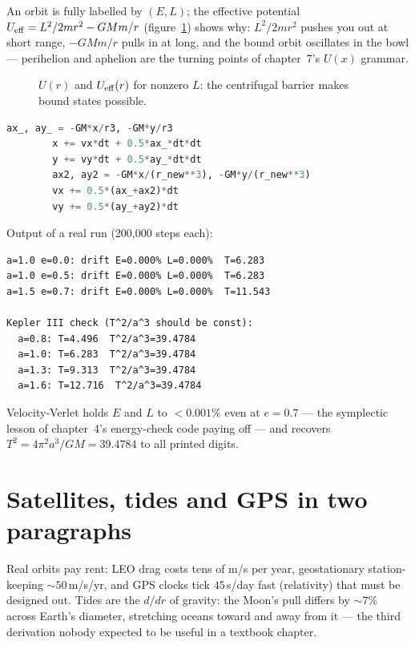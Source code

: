 An orbit is fully labelled by $(E,L)$; the effective potential
$U_{\rm eff}=L^{2}/2mr^{2}-GMm/r$ (figure~\ref{fig:ur}) shows why:
$L^{2}/2mr^{2}$ pushes you out at short range, $-GMm/r$ pulls in at
long, and the bound orbit oscillates in the bowl --- perihelion and
aphelion are the turning points of chapter~7's $U(x)$ grammar.

\begin{figure}[htbp]\centering

\caption{$U(r)$ and $U_{\rm eff}(r)$ for nonzero $L$: the centrifugal
barrier makes bound states possible.}
\label{fig:ur}
\end{figure}

\begin{lstlisting}[language=Python,caption={\texttt{code/ch08\_orbit\_verlet.py} --- velocity-Verlet orbit; $E,L$ drift and Kepler check.},label={lst:orbit}]
        ax_, ay_ = -GM*x/r3, -GM*y/r3
        x += vx*dt + 0.5*ax_*dt*dt
        y += vy*dt + 0.5*ay_*dt*dt
        ax2, ay2 = -GM*x/(r_new**3), -GM*y/(r_new**3)
        vx += 0.5*(ax_+ax2)*dt
        vy += 0.5*(ay_+ay2)*dt
\end{lstlisting}

Output of a real run (200{,}000 steps each):
\begin{lstlisting}[numbers=none]
a=1.0 e=0.0: drift E=0.000% L=0.000%  T=6.283
a=1.0 e=0.5: drift E=0.000% L=0.000%  T=6.283
a=1.5 e=0.7: drift E=0.000% L=0.000%  T=11.543

Kepler III check (T^2/a^3 should be const):
  a=0.8: T=4.496  T^2/a^3=39.4784
  a=1.0: T=6.283  T^2/a^3=39.4784
  a=1.3: T=9.313  T^2/a^3=39.4784
  a=1.6: T=12.716  T^2/a^3=39.4784
\end{lstlisting}

Velocity-Verlet holds $E$ and $L$ to $<0.001\%$ even at $e=0.7$ ---
the symplectic lesson of chapter~4's energy-check code paying off ---
and recovers $T^{2}=4\pi^{2}a^{3}/GM=39.4784$ to all printed digits.

\section{Satellites, tides and GPS in two paragraphs}\label{sec:grav-sat}

Real orbits pay rent: LEO drag costs tens of m/s per year, geostationary
station-keeping $\sim50$\,m/s/yr, and GPS clocks tick $45$\,\textmu s/day
fast (relativity) that must be designed out. Tides are the
$d/dr$ of gravity: the Moon's pull differs by $\sim7\%$ across Earth's
diameter, stretching oceans toward and away from it --- the third
derivation nobody expected to be useful in a textbook chapter.

